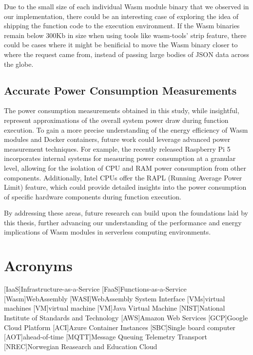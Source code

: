\documentclass[
  table]{report}
\begin{document}
Due to the small size of each individual \ac{Wasm} module binary that we
observed in our implementation, there could be an interesting case of
exploring the idea of shipping the function code to the execution
environment. If the \ac{Wasm} binaries remain below 300Kb in size when
using tools like wasm-tools' strip feature, there could be cases where
it might be benificial to move the \ac{Wasm} binary closer to where the
request came from, instead of passing large bodies of JSON data across
the globe.

\section{Accurate Power Consumption Measurements}

The power consumption measurements obtained in this study, while
insightful, represent approximations of the overall system power draw
during function execution. To gain a more precise understanding of the
energy efficiency of Wasm modules and Docker containers, future work
could leverage advanced power measurement techniques. For example, the
recently released Raspberry Pi 5 incorporates internal systems for
measuring power consumption at a granular level, allowing for the
isolation of CPU and RAM power consumption from other components.
Additionally, Intel CPUs offer the RAPL (Running Average Power Limit)
feature, which could provide detailed insights into the power
consumption of specific hardware components during function execution.

By addressing these areas, future research can build upon the
foundations laid by this thesis, further advancing our understanding of
the performance and energy implications of Wasm modules in serverless
computing environments.

\newpage

\chapter*{Acronyms}
\begin{acronym}
  [IaaS]{Infrastructure-as-a-Service}
  [FaaS]{Functions-as-a-Service}
  [Wasm]{WebAssembly}
  [WASI]{WebAssembly System Interface}
  [VMs]{virtual machines}
  [VM]{virtual machine}
  [VM]{Java Virtual Machine}
  [NIST]{National Institute of Standards and Technology}
  [AWS]{Amazon Web Services}
  [GCP]{Google Cloud Platform}
  [ACI]{Azure Container Instances}
  [SBC]{Single board computer}
  [AOT]{ahead-of-time}
  [MQTT]{Message Queuing Telemetry Transport}
  [NREC]{Norwegian Reasearch and Education Cloud}
\end{acronym}

\newpage


\printbibliography[title=References]
\end{document}

